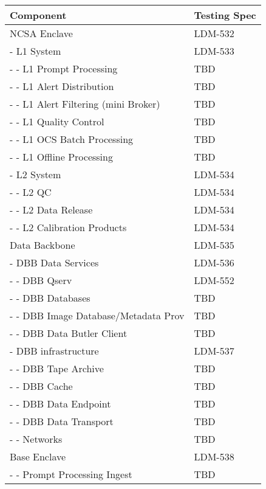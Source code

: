

\begin{longtable}{|p{}|p{}|}\hline
\textbf{Component} & \textbf{Testing Spec}\\ \hline
\rowcolor{orange}
NCSA Enclave & LDM-532 \\ \hline
\rowcolor{yellow}
- L1 System & LDM-533 \\ \hline
- - L1 Prompt Processing & TBD \\ \hline
- - L1 Alert Distribution & TBD \\ \hline
- - L1 Alert Filtering (mini Broker) & TBD \\ \hline
- - L1 Quality Control & TBD \\ \hline
- - L1 OCS Batch Processing & TBD \\ \hline
- - L1 Offline Processing & TBD \\ \hline
\rowcolor{yellow}
- L2 System & LDM-534 \\ \hline
- - L2 QC & LDM-534 \\ \hline
- - L2 Data Release & LDM-534 \\ \hline
- - L2 Calibration Products & LDM-534 \\ \hline
\rowcolor{orange}
Data Backbone & LDM-535 \\ \hline
\rowcolor{yellow}
- DBB Data Services & LDM-536 \\ \hline
- - DBB Qserv & LDM-552 \\ \hline
- - DBB Databases & TBD \\ \hline
- - DBB Image Database/Metadata Prov & TBD \\ \hline
- - DBB Data Butler Client & TBD \\ \hline
\rowcolor{yellow}
- DBB infrastructure & LDM-537 \\ \hline
- - DBB Tape Archive & TBD \\ \hline
- - DBB Cache & TBD \\ \hline
- - DBB Data Endpoint & TBD \\ \hline
- - DBB Data Transport & TBD \\ \hline
- - Networks  & TBD \\ \hline
\rowcolor{orange}
Base Enclave & LDM-538 \\ \hline
- - Prompt Processing Ingest  & TBD \\ \hline

\end{longtable}
